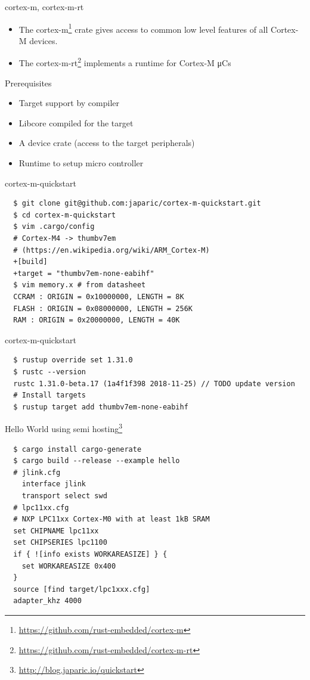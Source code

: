 \documentclass[aspectratio=1610,14pt,t]{beamer}
\begin{document}
\begin{frame}[c]{cortex-m, cortex-m-rt}
  \begin{itemize}
    \item The cortex-m\footnote{\url{https://github.com/rust-embedded/cortex-m}} crate gives access to common low level features of all Cortex-M devices.
    \item The cortex-m-rt\footnote{\url{https://github.com/rust-embedded/cortex-m-rt}} implements a runtime for Cortex-M μCs
  \end{itemize}
\end{frame}

\begin{frame}[c]{Prerequisites}
  \begin{itemize}
    \item \CheckedBox Target support by compiler
    \item \CheckedBox Libcore compiled for the target
    \item \CheckedBox A device crate (access to the target peripherals)
    \item \CheckedBox Runtime to setup micro controller
  \end{itemize}
\end{frame}

\begin{frame}[c,fragile]{cortex-m-quickstart}
  \begin{verbatim}
  $ git clone git@github.com:japaric/cortex-m-quickstart.git
  $ cd cortex-m-quickstart
  $ vim .cargo/config
  # Cortex-M4 -> thumbv7em
  # (https://en.wikipedia.org/wiki/ARM_Cortex-M)
  +[build]
  +target = "thumbv7em-none-eabihf"
  $ vim memory.x # from datasheet
  CCRAM : ORIGIN = 0x10000000, LENGTH = 8K
  FLASH : ORIGIN = 0x08000000, LENGTH = 256K
  RAM : ORIGIN = 0x20000000, LENGTH = 40K
  \end{verbatim}
\end{frame}

\begin{frame}[c,fragile]{cortex-m-quickstart}
  \begin{verbatim}
  $ rustup override set 1.31.0
  $ rustc --version
  rustc 1.31.0-beta.17 (1a4f1f398 2018-11-25) // TODO update version
  # Install targets
  $ rustup target add thumbv7em-none-eabihf
  \end{verbatim}
\end{frame}

\begin{frame}[c,fragile]{Hello World using semi hosting\footnote{\url{http://blog.japaric.io/quickstart}}}
  \begin{verbatim}
  $ cargo install cargo-generate
  $ cargo build --release --example hello
  # jlink.cfg
    interface jlink
    transport select swd
  # lpc11xx.cfg
  # NXP LPC11xx Cortex-M0 with at least 1kB SRAM
  set CHIPNAME lpc11xx
  set CHIPSERIES lpc1100
  if { ![info exists WORKAREASIZE] } {
    set WORKAREASIZE 0x400
  }
  source [find target/lpc1xxx.cfg]
  adapter_khz 4000
  \end{verbatim}
\end{frame}
\end{document}
